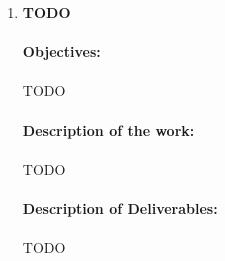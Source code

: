 \documentclass{article}
\begin{document}
\begin{enumerate}[label=\textbf{WP\arabic*:}]
\newpage
\item \textbf{TODO}
\paragraph{Objectives:} \paragraph{}
TODO
\paragraph{Description of the work:} \paragraph{}
TODO
\paragraph{Description of Deliverables:} \paragraph{}
TODO
\end{enumerate}
\end{document}
